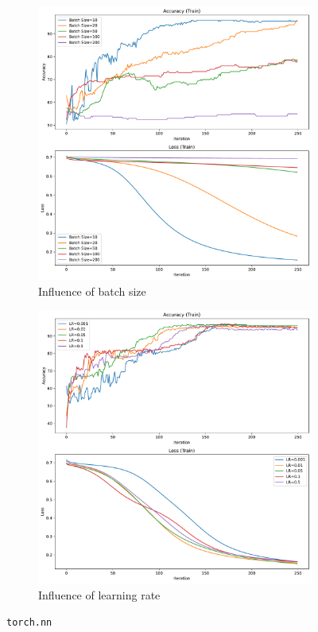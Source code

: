 \begin{figure}[H]\ContinuedFloat
    \centering
    \begin{subfigure}{0.45\textwidth}
        \centering
        \includegraphics[width=\textwidth]{figs/NN/torchnn_batch_size.pdf}
        \caption{Influence of batch size}
        \label{subfig:torchnn_batchsize}
    \end{subfigure}
    \begin{subfigure}{0.45\textwidth}
        \centering
        \includegraphics[width=\textwidth]{figs/NN/torchnn_lr.pdf}
        \caption{Influence of learning rate}
        \label{subfig:torchnn_lr}
    \end{subfigure}
    \caption{\texttt{torch.nn} }
    \label{fig:torchnn}
\end{figure}

